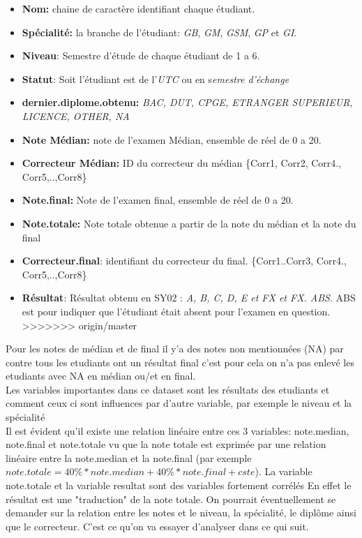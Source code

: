 \documentclass[]{report}
\begin{document}
\begin{itemize}
	\item \textbf{Nom:} chaine de caractère identifiant chaque étudiant.
	\item \textbf{Spécialité:} la branche de l'étudiant: \textit{GB}, \textit{GM}, \textit{GSM}, \textit{GP} et \textit{GI}.
	\item \textbf{Niveau}: Semestre d'étude de chaque étudiant de 1 a 6.
	\item \textbf{Statut}: Soit l'étudiant est de l'\textit{UTC} ou en s\textit{emestre d'échange}
	\item \textbf{dernier.diplome.obtenu:}
	\textit{BAC, DUT, CPGE, ETRANGER SUPERIEUR, LICENCE, OTHER, NA}
	\item \textbf{Note Médian:} note de l'examen Médian, ensemble de réel de 0 a 20.
	\item \textbf{Correcteur Médian:} ID du correcteur du médian \{Corr1, Corr2, Corr4., Corr5,..,Corr8\}
	\item \textbf{Note.final:} Note de l'examen final, ensemble de réel de 0 a 20.
	\item \textbf{Note.totale:} Note totale obtenue a partir de la note du médian et la note du final
	\item \textbf{Correcteur.final}: identifiant  du correcteur du final. \{Corr1..Corr3, Corr4., Corr5,..,Corr8\}
	\item \textbf{Résultat}: Résultat obtenu en SY02 : \textit{A, B, C, D, E et FX et FX. ABS}. ABS est pour indiquer que l'étudiant était absent pour l'examen en question.
>>>>>>> origin/master
\end{itemize}

Pour les notes de médian et de final il y'a des notes non mentionnées (NA) par contre tous les etudiants ont un résultat final c'est pour cela on n'a pas enlevé les etudiants avec NA en médian ou/et en final.\\
Les variables importantes dans ce dataset sont les résultats des etudiants et comment ceux ci sont influences par d'autre variable, par exemple le niveau et la spécialité\\
Il est évident qu'il existe une relation linéaire entre ces 3 variables: note.median, note.final et note.totale vu que la note totale est exprimée par une relation linéaire entre la note.median et la note.final (par exemple $note.totale = 40\% * note.median + 40\% * note.final + cste$). La variable note.totale et la variable resultat sont des variables fortement corrélés En effet le résultat est une "traduction"  de la note totale. On pourrait éventuellement se demander sur la relation entre les notes et le niveau, la spécialité, le diplôme ainsi que le correcteur. C'est ce qu'on va essayer d'analyser dans ce qui suit. 
\end{document}
